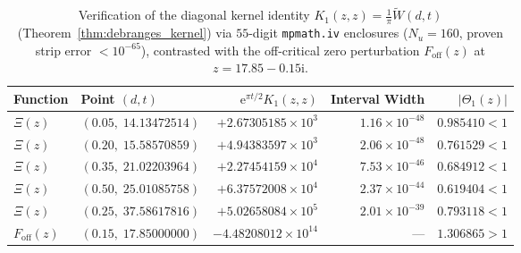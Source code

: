 \documentclass[11pt,reqno]{amsart}
\theoremstyle{definition}
\theoremstyle{remark}
\numberwithin{equation}{section}
\newcommand{\ii}{\mathrm{i}}
\newcommand{\ee}{\mathrm{e}}
\begin{document}
\begin{table}[htbp]
  \centering
  \caption{Verification of the diagonal kernel identity $K_1(z,z) = \frac{1}{\pi}\widetilde{W}(d,t)$ (Theorem~\ref{thm:debranges_kernel}) via $55$-digit \texttt{mpmath.iv} enclosures ($N_u = 160$, proven strip error $< 10^{-65}$), contrasted with the off-critical zero perturbation $F_{\mathrm{off}}(z)$ at $z = 17.85 - 0.15\ii$.}
  \label{tab:debranges_audit}
  \renewcommand{\arraystretch}{1.15}
  \begin{tabular}{@{}llrrr@{}}
    \toprule
    Function & Point $(d, t)$ & $\ee^{\pi t/2} K_1(z,z)$ & Interval Width & $\lvert\Theta_1(z)\rvert$ \\
    \midrule
    $\Xi(z)$ & $(0.05,\; 14.13472514)$ & $+2.67305185 \times 10^{3}$ & $1.16 \times 10^{-48}$ & $0.985410 < 1$ \\
    $\Xi(z)$ & $(0.20,\; 15.58570859)$ & $+4.94383597 \times 10^{3}$ & $2.06 \times 10^{-48}$ & $0.761529 < 1$ \\
    $\Xi(z)$ & $(0.35,\; 21.02203964)$ & $+2.27454159 \times 10^{4}$ & $7.53 \times 10^{-46}$ & $0.684912 < 1$ \\
    $\Xi(z)$ & $(0.50,\; 25.01085758)$ & $+6.37572008 \times 10^{4}$ & $2.37 \times 10^{-44}$ & $0.619404 < 1$ \\
    $\Xi(z)$ & $(0.25,\; 37.58617816)$ & $+5.02658084 \times 10^{5}$ & $2.01 \times 10^{-39}$ & $0.793118 < 1$ \\
    \midrule
    $F_{\mathrm{off}}(z)$ & $(0.15,\; 17.85000000)$ & $-4.48208012 \times 10^{14}$ & --- & $1.306865 > 1$ \\
    \bottomrule
  \end{tabular}
\end{table}
\end{document}

